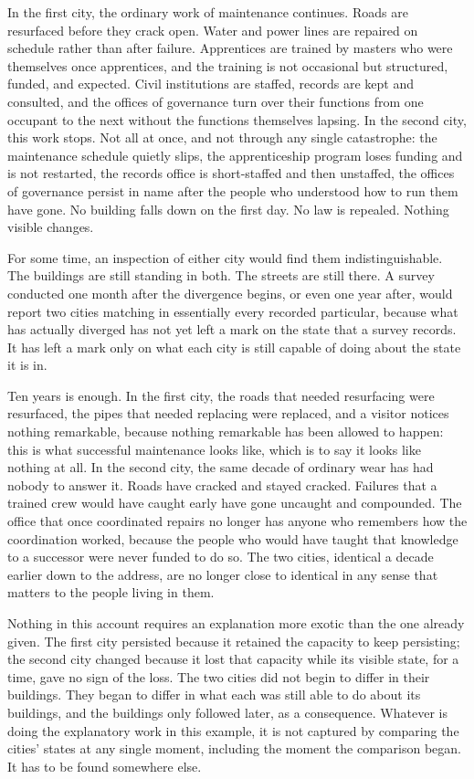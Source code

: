 \documentclass[11pt]{article}
\begin{document}
In the first city, the ordinary work of maintenance continues.
Roads are resurfaced before they crack open. Water and power lines
are repaired on schedule rather than after failure. Apprentices are
trained by masters who were themselves once apprentices, and the
training is not occasional but structured, funded, and expected. Civil
institutions are staffed, records are kept and consulted, and the
offices of governance turn over their functions from one occupant to
the next without the functions themselves lapsing. In the second
city, this work stops. Not all at once, and not through any single
catastrophe: the maintenance schedule quietly slips, the apprenticeship
program loses funding and is not restarted, the records office is
short-staffed and then unstaffed, the offices of governance persist
in name after the people who understood how to run them have gone. No
building falls down on the first day. No law is repealed. Nothing
visible changes.

For some time, an inspection of either city would find them
indistinguishable. The buildings are still standing in both. The
streets are still there. A survey conducted one month after the
divergence begins, or even one year after, would report two cities
matching in essentially every recorded particular, because what has
actually diverged has not yet left a mark on the state that a survey
records. It has left a mark only on what each city is still capable
of doing about the state it is in.

Ten years is enough. In the first city, the roads that needed
resurfacing were resurfaced, the pipes that needed replacing were
replaced, and a visitor notices nothing remarkable, because
nothing remarkable has been allowed to happen: this is what
successful maintenance looks like, which is to say it looks like
nothing at all. In the second city, the same decade of ordinary wear
has had nobody to answer it. Roads have cracked and stayed cracked.
Failures that a trained crew would have caught early have gone
uncaught and compounded. The office that once coordinated repairs no
longer has anyone who remembers how the coordination worked, because
the people who would have taught that knowledge to a successor were
never funded to do so. The two cities, identical a decade earlier
down to the address, are no longer close to identical in any sense
that matters to the people living in them.

Nothing in this account requires an explanation more exotic than the
one already given. The first city persisted because it retained the
capacity to keep persisting; the second city changed because it lost
that capacity while its visible state, for a time, gave no sign of
the loss. The two cities did not begin to differ in their buildings.
They began to differ in what each was still able to do about its
buildings, and the buildings only followed later, as a consequence.
Whatever is doing the explanatory work in this example, it is not
captured by comparing the cities' states at any single moment,
including the moment the comparison began. It has to be found
somewhere else.
\end{document}
